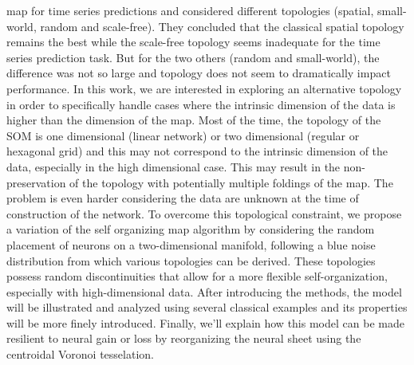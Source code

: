 map for time series predictions and considered different topologies
(spatial, small-world, random and scale-free). They concluded that the
classical spatial topology remains the best while the scale-free
topology seems inadequate for the time series prediction task. But for
the two others (random and small-world), the difference was not so
large and topology does not seem to dramatically impact performance.
%
%
In this work, we are interested in exploring an alternative topology
in order to specifically handle cases where the intrinsic dimension of
the data is higher than the dimension of the map.  Most of the time,
the topology of the SOM is one dimensional (linear network) or two
dimensional (regular or hexagonal grid) and this may not correspond to
the intrinsic dimension of the data, especially in the high
dimensional case. This may result in the non-preservation of the
topology \citep{Villmann:1999} with potentially multiple foldings of
the map. The problem is even harder considering the data are unknown
at the time of construction of the network. To overcome this
topological constraint, we propose a variation of the self organizing
map algorithm by considering the random placement of neurons on a
two-dimensional manifold, following a blue noise distribution from
which various topologies can be derived. These topologies possess
random discontinuities that allow for a more flexible
self-organization, especially with high-dimensional data. After
introducing the methods, the model will be illustrated and analyzed
using several classical examples and its properties will be more
finely introduced. Finally, we'll explain how this model can be made
resilient to neural gain or loss by reorganizing the neural sheet
using the centroidal Voronoi tesselation.

